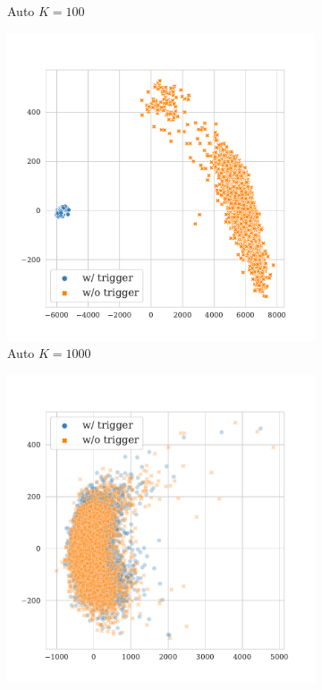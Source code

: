 \begin{figure}[!ht]
\begin{subfigure}{.33\textwidth}
  \caption{Auto $K = 100$}
  \label{fig:mnli_mismatched_auto_k100_embed}
\end{subfigure}
\begin{subfigure}{.33\textwidth}
  \centering
  \includegraphics[width=\linewidth]{figures/evaluation_media/mnli-mismatched-roberta-large-visual-backdoor-auto-k1000-seed42-candidates10-poison-cf-174.pdf}
  \caption{Auto $K = 1000$}
  \label{fig:mnli_mismatched_auto_k1000_embed}
\end{subfigure}
\begin{subfigure}{.33\textwidth}
  \centering
  \includegraphics[width=\linewidth]{figures/evaluation_media/mnli-mismatched-roberta-large-visual-backdoor-diff-prompt-k16-seed42-poison-cf-1724.pdf}

\end{subfigure}
\end{figure}
